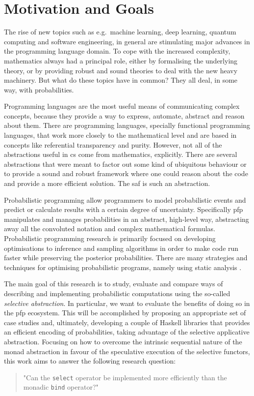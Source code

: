 \documentclass[
  oneside,
  11pt, a4paper,
  footinclude=true,
  headinclude=true,
  cleardoublepage=empty
]{scrbook}
\theoremstyle{definition}
\theoremstyle{definition}
\begin{document}
    \section{Motivation and Goals}\label{sec-moti-goals}
    
    The rise of new topics such as e.g.\ machine learning, deep learning, quantum computing and software engineering, in general are stimulating major advances in the programming language domain. To cope with the increased complexity, mathematics always had a principal role, either by formalising the underlying theory, or by providing robust and sound theories to deal with the new heavy machinery. But what do these topics have in common? They all deal, in some way, with probabilities. 
	    
	Programming languages are the most useful means of communicating complex concepts, because they provide a way to express, automate, abstract and reason about them. There are programming languages, specially functional programming languages, that work more closely to the mathematical level and are based in concepts like referential transparency and purity. 
	However, not all of the abstractions useful in \gls{cs} come from mathematics, explicitly. There are several abstractions that were meant to factor out some kind of ubiquitous behaviour or to provide a sound and robust framework where one could reason about the code and provide a more efficient solution. The \gls{saf} is such an abstraction.
	    
	Probabilistic programming allow programmers to model probabilistic events and predict or calculate results with a certain degree of uncertainty. Specifically \gls{pfp} manipulates and manages probabilities in an abstract, high-level way, abstracting away all the convoluted notation and complex mathematical formulas. Probabilistic programming research is primarily focused on developing optimisations to inference and sampling algorithms in order to make code run faster while preserving the posterior probabilities. There are many strategies and techniques for optimising probabilistic programs, namely using static analysis \citep{bernstein2019static}.
    
    The main goal of this research is to study, evaluate and compare ways of describing and implementing probabilistic computations using the so-called \emph{selective abstraction}. In particular, we want to evaluate the benefits of doing so in the \gls{pfp} ecosystem. This will be accomplished by proposing an appropriate set of case studies and, ultimately, developing a couple of Haskell libraries that provides an efficient encoding of probabilities, taking advantage of the selective applicative abstraction. Focusing on how to overcome the intrinsic sequential nature of the monad abstraction \citep{Scibior:2015:PPP:2887747.2804317} in favour of the speculative execution of the selective functors, this work aims to answer the following research question:
        \begin{quote}
        "Can the \texttt{select} operator be implemented more efficiently than the monadic \texttt{bind} operator?"
        \end{quote}
\end{document}
